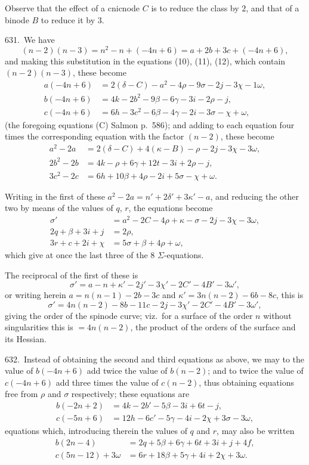 \documentclass[11pt,a4paper]{article}
\theoremstyle{plain}
\theoremstyle{definition}
\theoremstyle{remark}
\begin{document}
Observe that the effect of a cnicnode $C$ is to reduce the class by $2$, and that of a binode $B$ to reduce it by $3$.

631.\ We have
\[
(n-2)(n-3)=n^2-n+(-4n+6)=a+2b+3c+(-4n+6),
\]
and making this substitution in the equations (10), (11), (12), which contain $(n-2)(n-3)$, these become
\begin{align*}
a(-4n+6) &= 2(\delta-C)-a^2-4\rho-9\sigma-2j-3\chi-1\omega,\\
b(-4n+6) &= 4k-2b^2-9\beta-6\gamma-3i-2\rho-j,\\
c(-4n+6) &= 6h-3c^2-6\beta-4\gamma-2i-3\sigma-\chi+\omega,
\end{align*}
(the foregoing equations (C) Salmon p.~586); and adding to each equation four times the corresponding equation with the factor $(n-2)$, these become
\begin{align*}
a^2-2a &= 2(\delta-C)+4(\kappa-B)-\rho-2j-3\chi-3\omega,\\
2b^2-2b &= 4k-\rho+6\gamma+12t-3i+2\rho-j,\\
3c^2-2c &= 6h+10\beta+4\rho-2i+5\sigma-\chi+\omega.
\end{align*}

\newpage
\setcounter{page}{618}

Writing in the first of these $a^2-2a=n'+2\delta'+3\kappa'-a$, and reducing the other two by means of the values of $q$, $r$, the equations become
\begin{align*}
\sigma' &= a^2-2C-4\rho+\kappa-\sigma-2j-3\chi-3\omega,\\
2q+\beta+3i+j &= 2\rho,\\
3r+c+2i+\chi &= 5\sigma+\beta+4\rho+\omega,
\end{align*}
which give at once the last three of the 8 $\Sigma$-equations.

The reciprocal of the first of these is
\[
\sigma'=a-n+\kappa'-2j'-3\chi'-2C'-4B'-3\omega',
\]
or writing herein $a=n(n-1)-2b-3c$ and $\kappa'=3n(n-2)-6b-8c$, this is
\[
\sigma'=4n(n-2)-8b-11c-2j-3\chi'-2C'-4B'-3\omega',
\]
giving the order of the spinode curve; viz.\ for a surface of the order $n$ without singularities this is $=4n(n-2)$, the product of the orders of the surface and its Hessian.

632.\ Instead of obtaining the second and third equations as above, we may to the value of $b(-4n+6)$ add twice the value of $b(n-2)$; and to twice the value of $c(-4n+6)$ add three times the value of $c(n-2)$, thus obtaining equations free from $\rho$ and $\sigma$ respectively; these equations are
\begin{align*}
b(-2n+2) &= 4k-2b'-5\beta-3i+6t-j,\\
c(-5n+6) &= 12h-6c'-5\gamma-4i-2\chi+3\sigma-3\omega,
\end{align*}
equations which, introducing therein the values of $q$ and $r$, may also be written
\begin{align*}
b(2n-4) &= 2q+5\beta+6\gamma+6t+3i+j+4f,\\
c(5n-12)+3\omega &= 6r+18\beta+5\gamma+4i+2\chi+3\omega.
\end{align*}
\end{document}

